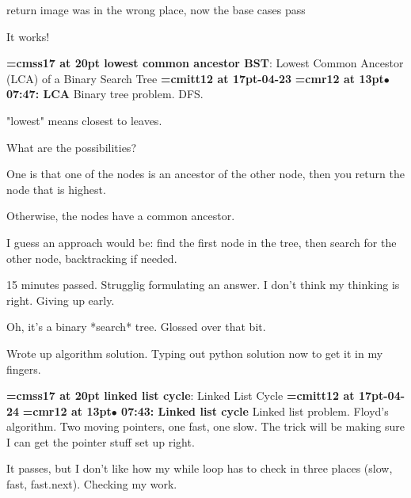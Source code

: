 return image was in the wrong place, now the base cases pass
\par

It works!
\par

{\medskip\noindent\bf\font\titlefont=cmss17 at 20pt lowest common ancestor BST}: Lowest Common Ancestor (LCA) of a Binary Search Tree
{\medskip\noindent\bf\font\titlefont=cmitt12 at 17pt-04-23}\medskip
{\smallskip\noindent\bf\font\titlefont=cmr12 at 13pt\titlefont $\bullet$ 07:47: LCA}\smallskip
Binary tree problem. DFS.
\par

"lowest" means closest to leaves.
\par

What are the possibilities?
\par

One is that one of the nodes is an ancestor of the other node, then you return the node that is highest.
\par

Otherwise, the nodes have a common ancestor.
\par

I guess an approach would be: find the first node in the tree, then search for the other node, backtracking if needed.
\par

15 minutes passed. Strugglig formulating an answer. I don't think my thinking is right. Giving up early.
\par

Oh, it's a binary *search* tree. Glossed over that bit.
\par

Wrote up algorithm solution. Typing out python solution now to get it in my fingers.
\par

{\medskip\noindent\bf\font\titlefont=cmss17 at 20pt linked list cycle}: Linked List Cycle
{\medskip\noindent\bf\font\titlefont=cmitt12 at 17pt-04-24}\medskip
{\smallskip\noindent\bf\font\titlefont=cmr12 at 13pt\titlefont $\bullet$ 07:43: Linked list cycle}\smallskip
Linked list problem. Floyd's algorithm. Two moving pointers, one fast, one slow. The trick will be making sure I can get the pointer stuff set up right.
\par

It passes, but I don't like how my while loop has to check in three places (slow, fast, fast.next). Checking my work.
\par

